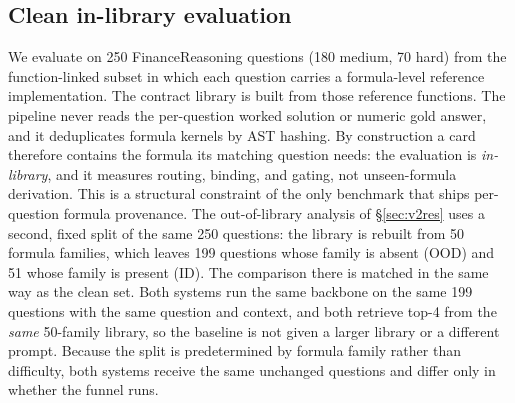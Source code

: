 \documentclass[sigconf,anonymous]{acmart}
\begin{document}
\subsection{Clean in-library evaluation}
We evaluate on 250 FinanceReasoning \cite{tang2025financereasoning} questions (180 medium, 70 hard) from the function-linked subset in which each question carries a formula-level reference implementation.
The contract library is built from those reference functions. The pipeline never reads the per-question worked solution or numeric gold answer, and it deduplicates formula kernels by AST hashing.
By construction a card therefore contains the formula its matching question needs: the evaluation is \emph{in-library}, and it measures routing, binding, and gating, not unseen-formula derivation.
This is a structural constraint of the only benchmark that ships per-question formula provenance.
The out-of-library analysis of \S\ref{sec:v2res} uses a second, fixed split of the same 250 questions: the library is rebuilt from 50 formula families, which leaves 199 questions whose family is absent (OOD) and 51 whose family is present (ID). The comparison there is matched in the same way as the clean set. Both systems run the same backbone on the same 199 questions with the same question and context, and both retrieve top-4 from the \emph{same} 50-family library, so the baseline is not given a larger library or a different prompt. Because the split is predetermined by formula family rather than difficulty, both systems receive the same unchanged questions and differ only in whether the funnel runs.
\end{document}
